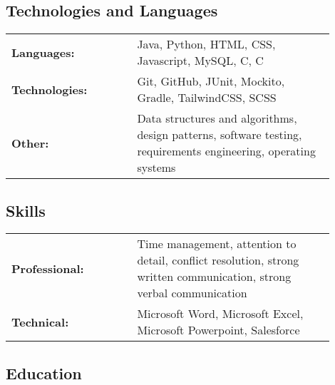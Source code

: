 \documentclass[10pt,a4paper]{article}
\newcommand{\CPP}{
	C\nolinebreak[4]\hspace{-.05em}\raisebox{.22ex}{\footnotesize\bf ++}
}
\def \tablecolone {0.35}
\def \tablecoltwo {0.55}
\begin{document}

\subsection*{\textcolor{accent}{\Large Technologies and Languages  \sout{\hfill}}} 

\begin{tabular}{p{\tablecolone\linewidth} p{\tablecoltwo\linewidth}}
	\textbf{Languages:}    & Java, Python, HTML, CSS, Javascript, MySQL, C, \CPP                                                                 \\
	\textbf{Technologies:} & Git, GitHub, JUnit, Mockito, Gradle, TailwindCSS, SCSS                                                         \\
	\textbf{Other:}        & Data structures and algorithms, design patterns, software testing, requirements engineering, operating systems \\
\end{tabular}



\subsection*{\textcolor{accent}{\Large Skills  \sout{\hfill}}} 

\begin{tabular}{p{\tablecolone\linewidth} p{\tablecoltwo\linewidth}}
	\textbf{Professional:} & Time management, attention to detail, conflict resolution, strong written communication, strong verbal communication \\
	\textbf{Technical:}    & Microsoft Word, Microsoft Excel, Microsoft Powerpoint, Salesforce                                                    \\
\end{tabular}



\subsection*{\textcolor{accent}{\Large Education  \sout{\hfill}}} 
\end{document}
